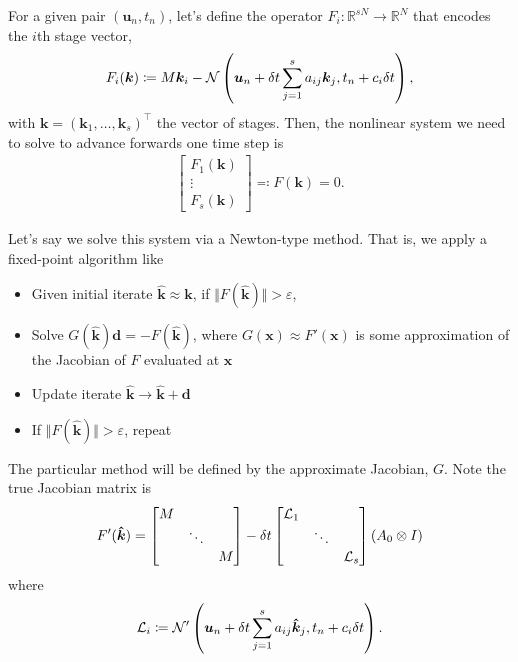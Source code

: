 \documentclass[review]{siamart}
\begin{document}
For a given pair $(\bm{u}_n,t_n)$, let's define the operator $F_i \colon \mathbb{R}^{sN} \to \mathbb{R}^N$ that encodes the $i$th stage vector,
\begin{align}
F_i(\bm{k}) \coloneqq M \bm{k}_i - {\cal N} \left(\bm{u}_n + \delta t \sum \limits_{j = 1}^s a_{ij} \bm{k}_j, t_n + c_i  \delta t \right),
\end{align}
with $\bm{k} = (\bm{k}_1, \ldots, \bm{k}_s)^\top$ the vector of stages. Then, the nonlinear system we need to solve to advance forwards one time step is
\begin{align}
\begin{bmatrix}
F_{1}(\bm{k})\\
\vdots \\
F_{s}(\bm{k})
\end{bmatrix}
\eqqcolon F(\bm{k}) = 0.
\end{align}

Let's say we solve this system via a Newton-type method. That is, we apply a fixed-point algorithm like 
\begin{itemize}
\item Given initial iterate $\bm{\hat{k}} \approx \bm{k}$, if $\Vert F(\bm{\hat{k}}) \Vert > \varepsilon$, 
\item Solve $G(\bm{\hat{k}}) \bm{d} = - F(\bm{\hat{k}})$, where $G(\bm{x}) \approx F'(\bm{x})$ is some approximation of the Jacobian of $F$ evaluated at $\bm{x}$
\item Update iterate $\bm{\hat{k}} \to \bm{\hat{k}} + \bm{d}$ 
\item If $\Vert F(\bm{\hat{k}}) \Vert > \varepsilon$, repeat
\end{itemize}

The particular method will be defined by the approximate Jacobian, $G$. Note the true Jacobian matrix is
\begin{align}
F'(\bm{\hat{k}}) = 
\begin{bmatrix} M \\ 
& \ddots \\ 
& & M
\end{bmatrix}
- 
\delta t
\begin{bmatrix} {\cal L}_1 \\ 
& \ddots \\ 
& & {\cal L}_s
\end{bmatrix}
(A_0 \otimes I)
\end{align}
where
\begin{align}
{\cal L}_i \coloneqq {\cal N}' \left(\bm{u}_n + \delta t \sum \limits_{j=1}^s a_{ij} \bm{\hat{k}}_j, t_n + c_i \delta t \right).
\end{align}
\end{document}
